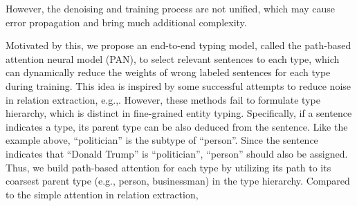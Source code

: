 \documentclass[letterpaper]{article} %
\begin{document}
However, the denoising and training process are not unified, which may cause error propagation and bring much additional complexity.

Motivated by this, we propose an end-to-end typing model, called the path-based attention neural model (PAN), %
to select relevant sentences to each type, which can dynamically reduce the weights of wrong labeled sentences for each type during training. 
This idea is inspired by some successful attempts to reduce noise in relation extraction, e.g.,\cite{Lin2016Neural}. %
However, these methods fail to formulate type hierarchy, which is distinct in fine-grained entity typing. 
Specifically, %
if a sentence indicates a type, its parent type can be also deduced from the sentence. 
Like the example above, ``politician'' is the subtype of ``person''. Since the sentence indicates that ``Donald Trump'' is ``politician'',  ``person'' should also be assigned. 
Thus, we build path-based attention for each type by utilizing its path to its coarsest parent type (e.g., person, businessman) in the type hierarchy. Compared to the simple attention in relation extraction, %
\end{document}
